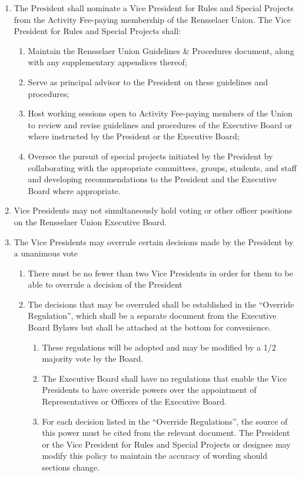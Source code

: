 \begin{enumerate}
\begin{enumerate}
  \end{enumerate}
\item The President shall nominate a Vice President for Rules and Special Projects from the Activity Fee-paying membership of the Rensselaer Union. The Vice President for Rules and Special Projects shall:
  \begin{enumerate}
  \item Maintain the Rensselaer Union Guidelines \& Procedures document, along with any supplementary appendices thereof;
  \item Serve as principal advisor to the President on these guidelines and procedures;
  \item Host working sessions open to Activity Fee-paying members of the Union to review and revise guidelines and procedures of the Executive Board or where instructed by the President or the Executive Board;
  \item Oversee the pursuit of special projects initiated by the President by collaborating with the appropriate committees, groups, students, and staff and developing recommendations to the President and the Executive Board where appropriate.
  \end{enumerate}
\item Vice Presidents may not simultaneously hold voting or other officer positions on the Rensselaer Union Executive Board.
\item The Vice Presidents may overrule certain decisions made by the President by a unanimous vote
  \begin{enumerate}
  \item There must be no fewer than two Vice Presidents in order for them to be able to overrule a decision of the President
  \item The decisions that may be overruled shall be established in the ``Override Regulation'', which shall be a separate document from the Executive Board Bylaws but shall be attached at the bottom for convenience.
    \begin{enumerate}
    \item These regulations will be adopted and may be modified by a 1/2 majority vote by the Board.
    \item The Executive Board shall have no regulations that enable the Vice Presidents to have override powers over the appointment of Representatives or Officers of the Executive Board.
    \item For each decision listed in the ``Override Regulations'', the source of this power must be cited from the relevant document. The President or the Vice President for Rules and Special Projects or designee may modify this policy to maintain the accuracy of wording should sections change.

\end{enumerate}
\end{enumerate}
\end{enumerate}
